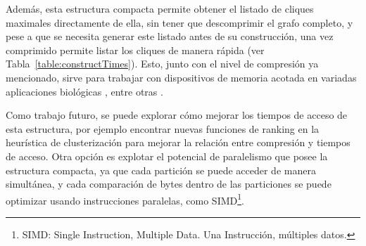 Además, esta estructura compacta permite obtener el listado de cliques maximales directamente de ella, sin tener que descomprimir el grafo completo, y pese a que se necesita generar este listado antes de su construcción, una vez comprimido permite listar los cliques de manera rápida (ver Tabla~\ref{table:constructTimes}). Esto, junto con el nivel de compresión ya mencionado, sirve para trabajar con dispositivos de memoria acotada en variadas aplicaciones biológicas \cite{eblen2012maximum, hendrix2010theoretical}, entre otras \cite{bomze1999maximum}.

Como trabajo futuro, se puede explorar cómo mejorar los tiempos de acceso de esta estructura, por ejemplo encontrar nuevas funciones de ranking en la heurística de  clusterización para mejorar la relación entre compresión y tiempos de acceso. Otra opción es explotar el potencial de paralelismo que posee la estructura compacta, ya que cada partición se puede acceder de manera simultánea, y cada comparación de bytes dentro de las particiones se puede optimizar usando instrucciones paralelas, como SIMD\footnote{SIMD: Single Instruction, Multiple Data. Una Instrucción, múltiples datos.}.
